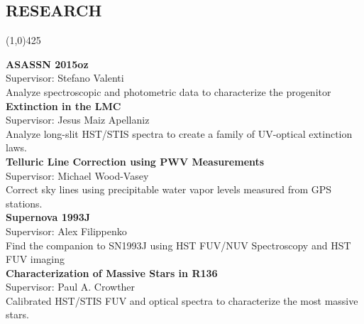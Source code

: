 \documentclass{res}
\begin{document}
\begin{resume}
\section{RESEARCH} 
\vspace{-.2in}
\begin{center}
\line(1,0){425}
\end{center}
\vspace{-.3in}
\vspace{0.1in}
{\bf ASASSN 2015oz} \hspace{179pt} \\
\hspace*{24pt}Supervisor: Stefano Valenti\\
\hspace*{24pt}Analyze spectroscopic and photometric data to characterize the progenitor\\
{\bf Extinction in the LMC}\hspace{149.95pt} \\
\hspace*{24pt}Supervisor: Jesus Maiz Apellaniz\\
\hspace*{24pt}Analyze long-slit HST/STIS spectra to create a family of UV-optical extinction laws. \\
{\bf Telluric Line Correction using PWV Measurements} \hspace{2pt} \\
\hspace*{24pt}Supervisor: Michael Wood-Vasey\\
\hspace*{24pt}Correct sky lines using precipitable water vapor levels measured from GPS stations. \\
{\bf  Supernova 1993J}\hspace{180pt} \\
\hspace*{24pt}Supervisor: Alex Filippenko \\
\hspace*{24pt}Find the companion to SN1993J using HST FUV/NUV Spectroscopy and HST FUV imaging \\
{\bf  Characterization of Massive Stars in R136 } \hspace{45pt} \\
\hspace*{24pt}Supervisor: Paul A. Crowther\\
\hspace*{24pt}Calibrated HST/STIS FUV and optical spectra to characterize the most massive stars. \\

\end{resume}
\end{document}
